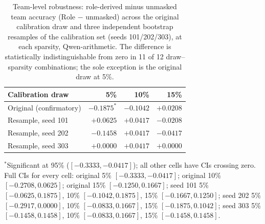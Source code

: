 \begin{table}[t]
\centering
\caption{Team-level robustness: role-derived minus unmasked team accuracy (Role $-$ unmasked) across the
original calibration draw and three independent bootstrap resamples of the calibration set
(seeds 101/202/303), at each sparsity, Qwen-arithmetic. The difference is statistically
indistinguishable from zero in 11 of 12 draw--sparsity combinations; the sole exception is
the original draw at 5\%.}
\label{tab:claim2-robustness}
\begin{tabular}{lrrr}
\toprule
Calibration draw & 5\% & 10\% & 15\% \\
\midrule
Original (confirmatory) & $\mathbf{-0.1875^{*}}$ & $-0.1042$ & $+0.0208$ \\
Resample, seed 101       & $+0.0625$ & $+0.0417$ & $-0.0208$ \\
Resample, seed 202       & $-0.1458$ & $+0.0417$ & $-0.0417$ \\
Resample, seed 303       & $+0.0000$ & $+0.0417$ & $+0.0000$ \\
\bottomrule
\end{tabular}

\smallskip
\footnotesize $^{*}$Significant at 95\% ($[-0.3333, -0.0417]$); all other cells have CIs crossing
zero. Full CIs for every cell: original 5\% $[-0.3333,-0.0417]$; original 10\%
$[-0.2708,0.0625]$; original 15\% $[-0.1250,0.1667]$; seed 101 5\% $[-0.0625,0.1875]$, 10\%
$[-0.1042,0.1875]$, 15\% $[-0.1667,0.1250]$; seed 202 5\% $[-0.2917,0.0000]$, 10\%
$[-0.0833,0.1667]$, 15\% $[-0.1875,0.1042]$; seed 303 5\% $[-0.1458,0.1458]$, 10\%
$[-0.0833,0.1667]$, 15\% $[-0.1458,0.1458]$.
\end{table}
